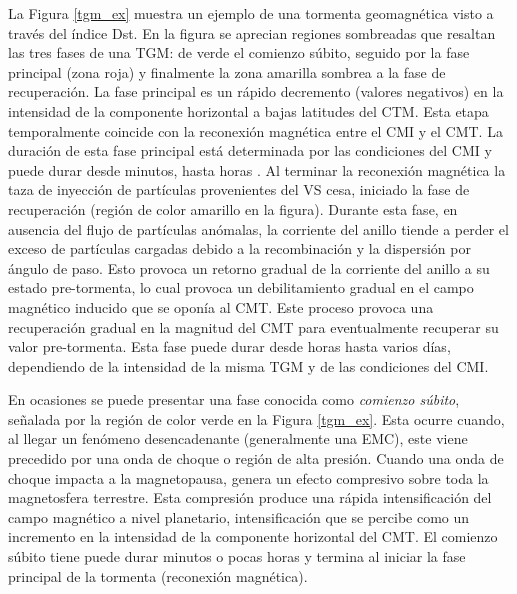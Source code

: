 La Figura \ref{tgm_ex} muestra un ejemplo de una tormenta geomagnética visto a través del índice Dst. En la figura se aprecian regiones sombreadas que resaltan las tres fases de una TGM: de verde el comienzo súbito, seguido por la fase principal (zona roja) y finalmente la zona amarilla sombrea a la fase de recuperación. La fase principal es un rápido decremento (valores negativos) en la intensidad de la componente horizontal a bajas latitudes del CTM. Esta etapa temporalmente coincide con la reconexión magnética entre el CMI y el CMT. La duración de esta fase principal está determinada por las condiciones del CMI y puede durar desde minutos, hasta horas \cite{l_handbook_geof_sw_Geom_field}. Al terminar la reconexión magnética la taza de inyección de partículas provenientes del VS cesa, iniciado la fase de recuperación (región de color amarillo en la figura). Durante esta fase, en ausencia del flujo de partículas anómalas, la corriente del anillo tiende a perder el exceso de partículas cargadas debido a la recombinación y la dispersión por ángulo de paso. Esto provoca un retorno gradual de la corriente del anillo a su estado pre-tormenta, lo cual provoca un debilitamiento gradual en el campo magnético inducido que se oponía al CMT. Este proceso provoca una recuperación gradual en la magnitud del CMT para eventualmente recuperar su valor pre-tormenta. Esta fase puede durar desde horas hasta varios días, dependiendo de la intensidad de la misma TGM y de las condiciones del CMI.
\vspace{ 1 em}

En ocasiones se puede presentar una fase conocida como \emph{comienzo súbito}, señalada por la región de color verde en la Figura \ref{tgm_ex}. Esta ocurre cuando, al llegar un fenómeno desencadenante (generalmente una EMC), este viene precedido por una onda de choque o región de alta presión. Cuando una onda de choque impacta a la magnetopausa, genera un efecto compresivo sobre toda la magnetosfera terrestre. Esta compresión produce una rápida intensificación del campo magnético a nivel planetario, intensificación que se percibe como un incremento en la intensidad de la componente horizontal del CMT. El comienzo súbito tiene puede durar minutos o pocas horas \cite{l_handbook_geof_sw_Geom_field} y termina al iniciar la fase principal de la tormenta (reconexión magnética).
\vspace{1 em}

